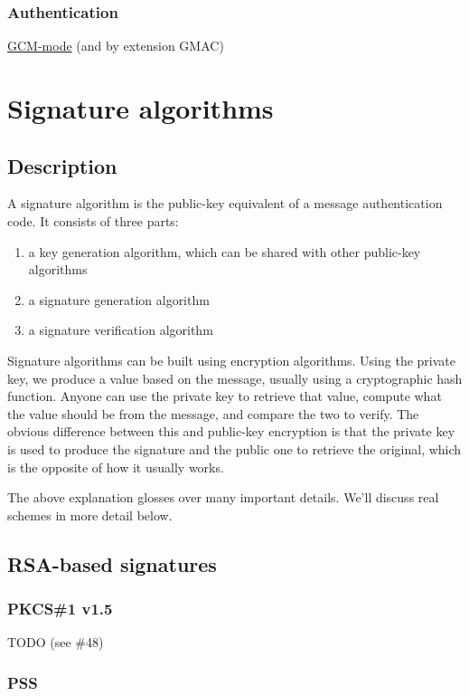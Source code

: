 \documentclass[11pt,ebook,table,dvipsnames]{memoir}
\begin{document}
\subsection{Authentication}
\label{sec-2-7-9-1}

\hyperref[GCM mode]{GCM-mode} (and by extension GMAC)
\chapter{Signature algorithms}
\label{sec-2-8}
\section{Description}
\label{sec-2-8-1}

A signature algorithm is the public-key equivalent of a message
authentication code. It consists of three parts:

\begin{enumerate}
\item a key generation algorithm, which can be shared with other
public-key algorithms
\item a signature generation algorithm
\item a signature verification algorithm
\end{enumerate}

Signature algorithms can be built using encryption algorithms. Using
the private key, we produce a value based on the message, usually
using a cryptographic hash function. Anyone can use the private key to
retrieve that value, compute what the value should be from the
message, and compare the two to verify. The obvious difference between
this and \gls{public-key encryption} is that the private key is used
to produce the signature and the public one to retrieve the original,
which is the opposite of how it usually works.

The above explanation glosses over many important details. We'll
discuss real schemes in more detail below.

\section{RSA-based signatures}
\label{sec-2-8-2}
\subsection{PKCS\#1 v1.5}
\label{sec-2-8-2-1}

TODO (see \#48)
\subsection{PSS}
\label{sec-2-8-2-2}
\end{document}
